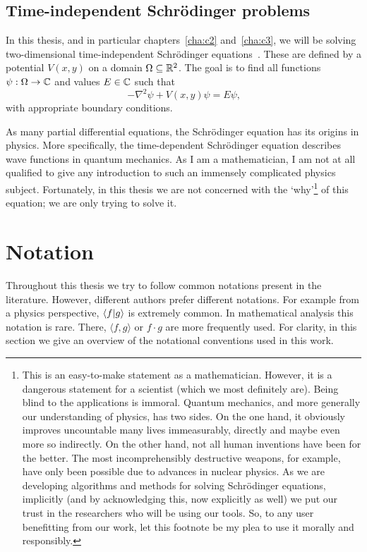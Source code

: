 \subsection{Time-independent Schrödinger problems}

In this thesis, and in particular chapters~\ref{cha:c2} and~\ref{cha:c3}, we will be solving two-dimensional time-independent Schrödinger equations~\cite{schrodinger_quantisierung_1926}. These are defined by a potential $V(x, y)$ on a domain $\Omega \subseteq \mathbb{R}^2$. The goal is to find all functions $\psi : \Omega \to \mathbb{C}$ and values $E \in \mathbb{C}$ such that
$$
-\nabla^2\psi + V(x, y) \psi = E \psi\text{,}
$$
with appropriate boundary conditions.

As many partial differential equations, the Schrödinger equation has its origins in physics. More specifically, the time-dependent Schrödinger equation describes wave functions in quantum mechanics. As I am a mathematician, I am not at all qualified to give any introduction to such an immensely complicated physics subject. Fortunately, in this thesis we are not concerned with the `why'\footnote{This is an easy-to-make statement as a mathematician. However, it is a dangerous statement for a scientist (which we most definitely are). Being blind to the applications is immoral. Quantum mechanics, and more generally our understanding of physics, has two sides. On the one hand, it obviously improves uncountable many lives immeasurably, directly and maybe even more so indirectly. On the other hand, not all human inventions have been for the better. The most incomprehensibly destructive weapons, for example, have only been possible due to advances in nuclear physics. As we are developing algorithms and methods for solving Schrödinger equations, implicitly (and by acknowledging this, now explicitly as well) we put our trust in the researchers who will be using our tools. So, to any user benefitting from our work, let this footnote be my plea to use it morally and responsibly.} of this equation; we are only trying to solve it.

\section{Notation}

Throughout this thesis we try to follow common notations present in the literature. However, different authors prefer different notations. For example from a physics perspective, $\bra{f}\ket{g}$ is extremely common. In mathematical analysis this notation is rare. There, $\langle f, g \rangle$ or $f \cdot g$ are more frequently used. For clarity, in this section we give an overview of the notational conventions used in this work.

